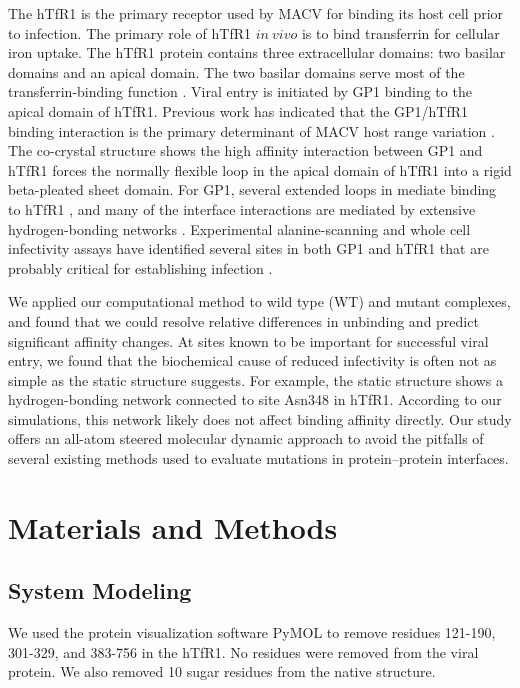 \documentclass[12pt]{article}
\begin{document}
The hTfR1 is the primary receptor used by MACV for binding its host cell prior to infection. The primary role of hTfR1 $in~vivo$ is to bind transferrin for cellular iron uptake. The hTfR1 protein contains three extracellular domains: two basilar domains and an apical domain. The two basilar domains serve most of the transferrin-binding function \citep{Abraham2010,Rad20112}. Viral entry is initiated by GP1 binding to the apical domain of hTfR1. Previous work has indicated that the GP1/hTfR1 binding interaction is the primary determinant of MACV host range variation \citep{Rad20111,Rad20112}. The co-crystal structure shows the high affinity interaction between GP1 and hTfR1 forces the normally flexible loop in the apical domain of hTfR1 into a rigid beta-pleated sheet domain. For GP1, several extended loops in mediate binding to hTfR1 \citep{Abraham2010,Rad20112}, and many of the interface interactions are mediated by extensive hydrogen-bonding networks \citep{Abraham2010}. Experimental alanine-scanning and whole cell infectivity assays have identified several sites in both GP1 and hTfR1 that are probably critical for establishing infection \citep{Rad20111,Rad20112}.

We applied our computational method to wild type (WT) and mutant complexes, and found that we could resolve relative differences in unbinding and predict significant affinity changes. At sites known to be important for successful viral entry, we found that the biochemical cause of reduced infectivity is often not as simple as the static structure suggests. For example, the static structure shows a hydrogen-bonding network connected to site Asn348 in hTfR1. According to our simulations, this network likely does not affect binding affinity directly. Our study offers an all-atom steered molecular dynamic approach to avoid the pitfalls of several existing methods used to evaluate mutations in protein--protein interfaces.

\section*{Materials and Methods}

\subsection*{System Modeling}

We used the protein visualization software PyMOL \citep{PyMOL} to remove residues 121-190, 301-329, and 383-756 in the hTfR1. No residues were removed from the viral protein. We also removed 10 sugar residues from the native structure.
\end{document}
